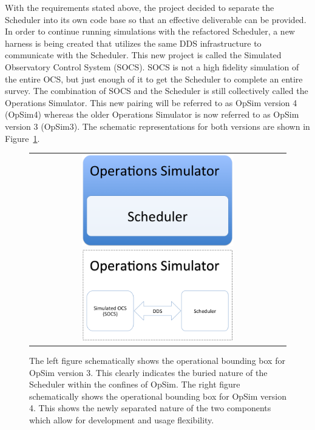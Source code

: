 \documentclass[]{spie}  %
\begin{document}
With the requirements stated above, the project decided to separate the Scheduler\cite{Delgado_SPIE2016} into its own code base so that an effective deliverable can be provided.  In order to continue running simulations with the refactored Scheduler, a new harness is being created that utilizes the same DDS infrastructure to communicate with the Scheduler. This new project is called the Simulated Observatory Control System (SOCS). SOCS is not a high fidelity simulation of the entire OCS, but just enough of it to get the Scheduler to complete an entire survey. The combination of SOCS and the Scheduler is still collectively called the Operations Simulator. This new pairing will be referred to as OpSim version 4 (OpSim4) whereas the older Operations Simulator is now referred to as OpSim version 3 (OpSim3). The schematic representations for both versions are shown in Figure~\ref{fig:opsim}.

\begin{figure} [ht]
  	\begin{center}
  		\begin{tabular}{c} 
  			\includegraphics[height=4cm]{Opsimv3.png}
  			\includegraphics[height=4cm]{Opsimv4.png}
  		\end{tabular}
  	\end{center}
  	\caption[What is this?] 
  	{ \label{fig:opsim} 
  		The left figure schematically shows the operational bounding box for OpSim version 3. This clearly indicates the buried nature of the Scheduler within the confines of OpSim. The right figure schematically shows the operational bounding box for OpSim version 4. This shows the newly separated nature of the two components which allow for development and usage flexibility.}
\end{figure} 
\end{document}
